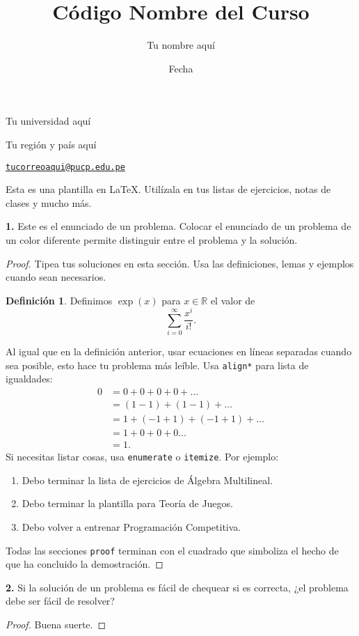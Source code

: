 \documentclass{article}
\title{C\'odigo Nombre del Curso}
\author{Tu nombre aqu\'i}
\date{Fecha}
\newenvironment{statement}[1]{\smallskip\noindent\color[rgb]{1.00,0.00,0.50} {\bf #1.}}{}
\theoremstyle{definition}
\newtheorem{defn}[theorem]{Definici\'on}
\theoremstyle{remark}
\newcommand{\BR}{\mathbb R}
\begin{document}
\maketitle

\vspace*{-0.25in}
\centerline{Tu universidad aqu\'i}
\centerline{Tu regi\'on y pa\'is aqu\'i}
\centerline{\href{mailto:tucorreoaqui@pucp.edu.pe}{{\tt tucorreoaqui@pucp.edu.pe}}}
\vspace*{0.15in}

\begin{framed}
  Esta es una plantilla en \LaTeX. Util\'izala en tus listas de ejercicios, notas de clases y mucho m\'as.
\end{framed}

\begin{statement}{1}
    Este es el enunciado de un problema. Colocar el enunciado de un problema de un color diferente permite distinguir entre el problema y la soluci\'on.
\end{statement}

\begin{proof}
    Tipea tus soluciones en esta secci\'on. Usa las definiciones, lemas y ejemplos cuando sean necesarios.
    \begin{defn}
        Definimos $\exp(x)$ para $x \in \BR$ el valor de $$\sum_{i = 0}^\infty\frac{x^i}{i!}.$$
    \end{defn}
    Al igual que en la definici\'on anterior, usar ecuaciones en l\'ineas separadas cuando sea posible, esto hace tu problema m\'as le\'ible. Usa {\tt align*} para lista de igualdades:
    \begin{align*}
        0 &= 0 + 0 + 0 + 0 + \dots\\
        &= (1 - 1) + (1 - 1) + \dots \\
        &= 1 + (-1 + 1) + (-1 + 1) + \dots \\
        &= 1 + 0 + 0 + 0 \dots \\
        &= 1.
    \end{align*}
    Si necesitas listar cosas, usa {\tt enumerate} o {\tt itemize}. Por ejemplo:
    \begin{enumerate}
        \item Debo terminar la lista de ejercicios de \'Algebra Multilineal.
        \item Debo terminar la plantilla para Teor\'ia de Juegos.
        \item Debo volver a entrenar Programaci\'on Competitiva.
    \end{enumerate}
    Todas las secciones {\tt proof} terminan con el cuadrado que simboliza el hecho de que ha concluido la demostraci\'on.
\end{proof}

\begin{statement}{2}
    Si la soluci\'on de un problema es f\'acil de chequear si es correcta, ¿el problema debe ser f\'acil de resolver?
\end{statement}

\begin{proof}
    Buena suerte.
\end{proof}
\end{document}
